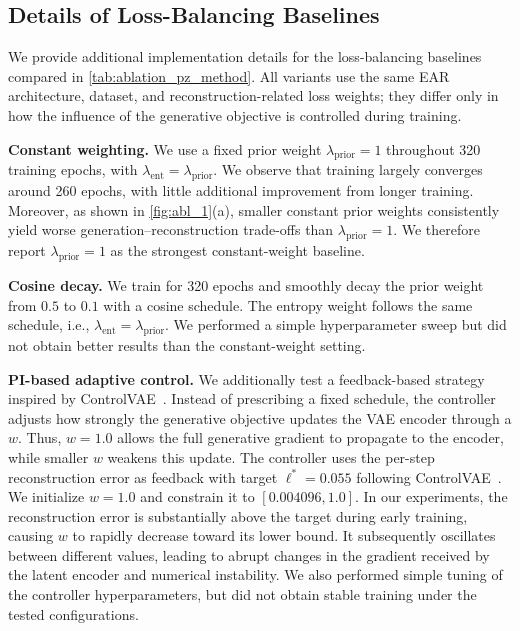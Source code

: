 \subsection{Details of Loss-Balancing Baselines}
\label{app:loss_balancing}

We provide additional implementation details for the loss-balancing baselines
compared in \cref{tab:ablation_pz_method}. All variants use the same EAR
architecture, dataset, and reconstruction-related loss weights; they differ only
in how the influence of the generative objective is controlled during training.

\textbf{Constant weighting.}
We use a fixed prior weight $\lambda_{\mathrm{prior}}=1$ throughout 320 training epochs, with
$\lambda_{\mathrm{ent}}=\lambda_{\mathrm{prior}}$.
We observe that training largely converges around 260 epochs, with little additional improvement from longer training.
Moreover, as shown in \cref{fig:abl_1}(a), smaller constant prior weights consistently yield worse generation--reconstruction trade-offs than $\lambda_{\mathrm{prior}}=1$.
We therefore report $\lambda_{\mathrm{prior}}=1$ as the strongest constant-weight baseline.

\textbf{Cosine decay.}
We train for 320 epochs and smoothly decay the prior weight from $0.5$ to $0.1$
with a cosine schedule. The entropy weight follows the same schedule,
i.e., $\lambda_{\mathrm{ent}}=\lambda_{\mathrm{prior}}$. We performed a simple hyperparameter sweep but did not obtain better results than the constant-weight setting.

\textbf{PI-based adaptive control.}
We additionally test a feedback-based strategy inspired by ControlVAE~\cite{shao2020controlvae}. 
Instead of prescribing a fixed schedule, the controller adjusts how strongly the generative objective updates the VAE encoder through a $w$. 
Thus, $w=1.0$ allows the full generative gradient to propagate to the encoder, while smaller $w$ weakens this update.
The controller uses the per-step reconstruction error as feedback with target $\ell^{*}=0.055$ following ControlVAE~\cite{shao2020controlvae}. 
We initialize $w=1.0$ and constrain it to $[0.004096,1.0]$. 
In our experiments, the reconstruction error is substantially above the target during early training, causing $w$ to rapidly decrease toward its lower bound. 
It subsequently oscillates between different values, leading to abrupt changes in the gradient received by the latent encoder and numerical instability. 
We also performed simple tuning of the controller hyperparameters, but did not obtain stable training under the tested configurations.

